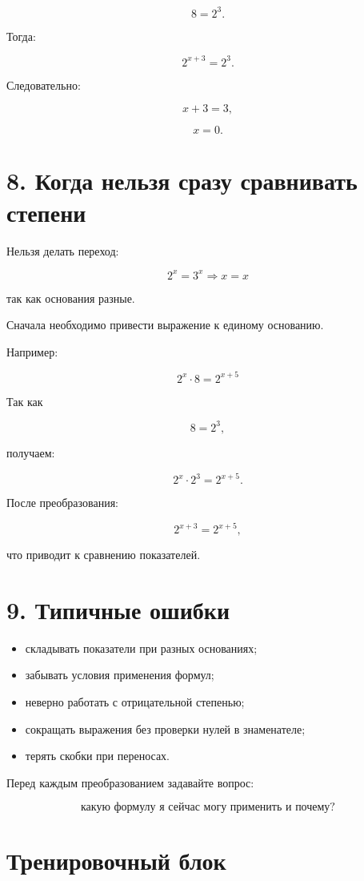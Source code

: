 \documentclass[a4paper,12pt]{article}
\begin{document}
\[
8=2^3.
\]

Тогда:

\[
2^{x+3}=2^3.
\]

Следовательно:

\[
x+3=3,
\]

\[
x=0.
\]

\section*{8. Когда нельзя сразу сравнивать степени}

Нельзя делать переход:

\[
2^x=3^x
\Rightarrow x=x
\]

так как основания разные.

Сначала необходимо привести выражение к единому основанию.

Например:

\[
2^x\cdot8=2^{x+5}
\]

Так как

\[
8=2^3,
\]

получаем:

\[
2^x\cdot2^3=2^{x+5}.
\]

После преобразования:

\[
2^{x+3}=2^{x+5},
\]

что приводит к сравнению показателей.

\section*{9. Типичные ошибки}

\begin{itemize}
\item складывать показатели при разных основаниях;
\item забывать условия применения формул;
\item неверно работать с отрицательной степенью;
\item сокращать выражения без проверки нулей в знаменателе;
\item терять скобки при переносах.
\end{itemize}

Перед каждым преобразованием задавайте вопрос:

\[
\boxed{\text{какую формулу я сейчас могу применить и почему?}}
\]

\clearpage

\section*{Тренировочный блок}
\end{document}
